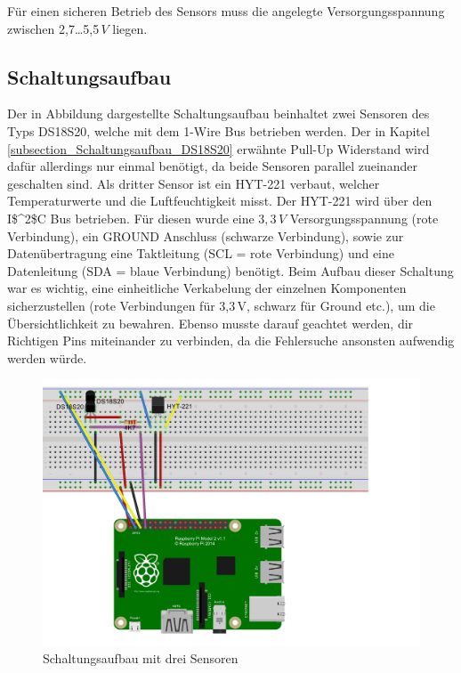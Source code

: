 Für einen sicheren Betrieb des Sensors muss die angelegte Versorgungsspannung zwischen 2,7\dots 5,5\,$V$ liegen.

\subsection{Schaltungsaufbau}
\label{subsection_Schaltungsaufbau_HYT221}
Der in Abbildung dargestellte Schaltungsaufbau beinhaltet zwei Sensoren des Typs DS18S20, welche mit dem 1-Wire Bus betrieben werden. Der in Kapitel \ref{subsection_Schaltungsaufbau_DS18S20} erwähnte Pull-Up Widerstand wird dafür allerdings nur einmal benötigt, da beide Sensoren parallel zueinander geschalten sind. Als dritter Sensor ist ein HYT-221 verbaut, welcher Temperaturwerte und die Luftfeuchtigkeit misst. Der HYT-221 wird über den \ac{I$^2$C} Bus betrieben. Für diesen wurde eine $3,3\,V$ Versorgungsspannung (rote Verbindung), ein GROUND Anschluss (schwarze Verbindung), sowie zur Datenübertragung eine Taktleitung (SCL = rote Verbindung) und eine Datenleitung (SDA = blaue Verbindung) benötigt. Beim Aufbau dieser Schaltung war es wichtig, eine einheitliche Verkabelung der einzelnen Komponenten sicherzustellen (rote Verbindungen für 3,3\,V, schwarz für Ground etc.), um die Übersichtlichkeit zu bewahren. Ebenso musste darauf geachtet werden, dir Richtigen Pins miteinander zu verbinden, da die Fehlersuche ansonsten aufwendig werden würde.

\begin{figure}[!h] 
  \centering
     \includegraphics[scale=.72]{BilderAllgemein/Schaltung_HYT221.png}
  \caption{Schaltungsaufbau mit drei Sensoren}
  \label{Abb_Schaltungsaufbau_HYT221}
\end{figure}

